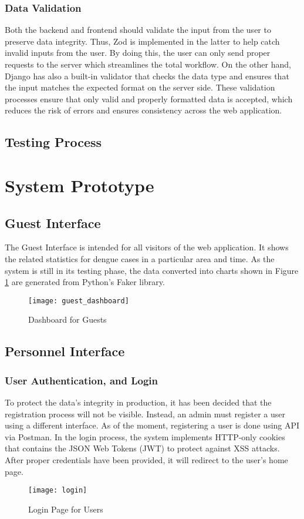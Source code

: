 \subsubsection{Data Validation}
Both the backend and frontend should validate the input from the user to preserve data integrity. Thus, Zod is implemented in the latter to help catch invalid inputs from the user. By doing this, the user can only send proper requests to the server which streamlines the total workflow. On the other hand, Django has also a built-in validator that checks the data type and ensures that the input matches the expected format on the server side. These validation processes ensure that only valid and properly formatted data is accepted, which reduces the risk of errors and ensures consistency across the web application. 

\subsection{Testing Process}

\section{System Prototype}
\subsection{Guest Interface}
The Guest Interface is intended for all visitors of the web application. It shows the related statistics for dengue cases in a particular area and time. As the system is still in its testing phase, the data converted into charts shown in Figure \ref{fig:guest_dashboard} are generated from Python's Faker library. 
\begin{figure}[H]
	\centering
	\texttt{[image: guest\_dashboard]}
	\caption{Dashboard for Guests}
	\label{fig:guest_dashboard}
\end{figure}
\subsection{Personnel Interface}
\subsubsection{User Authentication, and Login}
To protect the data's integrity in production, it has been decided that the registration process will not be visible. Instead, an admin must register a user using a different interface. As of the moment, registering a user is done using API via Postman. In the login process, the system implements HTTP-only cookies that contains the JSON Web Tokens (JWT) to protect against XSS attacks. After proper credentials have been provided, it will redirect to the user's home page.
\begin{figure}[H]
	\centering
	\texttt{[image: login]}
	\caption{Login Page for Users}
	\label{fig:login_page}
\end{figure}
